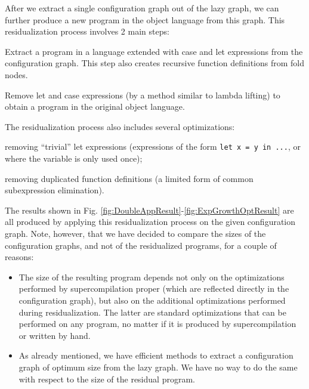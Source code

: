 \documentclass[submission,copyright,creativecommons]{eptcs}
\begin{document}
After we extract a single configuration graph out of the lazy graph, we can further
produce a new program in the object language from this graph.
This residualization process involves 2 main steps:
  \begin{enumerate*}[label=\itshape\arabic*\upshape)]
    \item Extract a program in a language extended with case and let expressions from the configuration graph.
      This step also creates recursive function definitions from fold nodes.
    \item Remove let and case expressions (by a method similar to lambda lifting) to
      obtain a program in the original object language.
  \end{enumerate*}
The residualization process also includes several optimizations:
  \begin{enumerate*}[label=\itshape\alph*\upshape)]
    \item removing ``trivial'' let expressions (expressions of the form \verb|let x = y in ...|, or where the variable is
      only used once);
    \item removing duplicated function definitions (a limited form of common subexpression elimination).
  \end{enumerate*}
The results shown in Fig. \ref{fig:DoubleAppResult}-\ref{fig:ExpGrowthOptResult} are all produced by applying
this residualization process on the given configuration graph.
Note, however, that we have decided to compare the sizes of the configuration graphs, and not of the residualized
programs, for a couple of reasons:
\begin{itemize}
  \item The size of the resulting program depends not only on the optimizations performed by supercompilation proper
    (which are reflected directly in the configuration graph), but also on the additional optimizations performed
    during residualization.
    The latter are standard optimizations that can be performed on any program, no matter if it is produced
    by supercompilation or written by hand.
  \item As already mentioned, we have efficient methods to extract a configuration graph of optimum size from the lazy graph.
    We have no way to do the same with respect to the size of the residual program.
\end{itemize}
\end{document}
